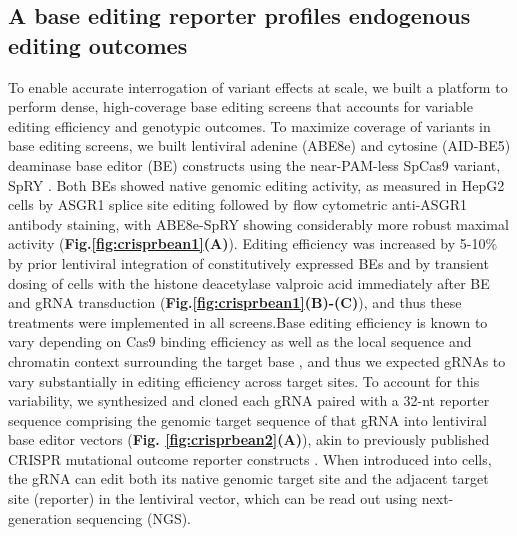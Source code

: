 \documentclass[a4paper, titlepage, openright]{book}
\begin{document}
\subsection{A base editing reporter profiles endogenous editing outcomes}
To enable accurate interrogation of variant effects at scale, we built a platform to perform dense, high-coverage base editing screens that accounts for variable editing efficiency and genotypic outcomes. To maximize coverage of variants in base editing screens, we built lentiviral adenine (ABE8e) \citep{gaudelli2017programmable, richter2020phage} and cytosine (AID-BE5) \citep{arbab2020determinants} deaminase base editor (BE) constructs using the near-PAM-less SpCas9 variant, SpRY \citep{walton2020unconstrained}. Both BEs showed native genomic editing activity, as measured in HepG2 cells by ASGR1 splice site editing followed by flow cytometric anti-ASGR1 antibody staining, with ABE8e-SpRY showing considerably more robust maximal activity (\textbf{Fig.\ref{fig:crisprbean1}(A)}). Editing efficiency was increased by 5-10\% by prior lentiviral integration of constitutively expressed BEs and by transient dosing of cells with the histone deacetylase valproic acid immediately after BE and gRNA transduction (\textbf{Fig.\ref{fig:crisprbean1}(B)-(C)}), and thus these treatments were implemented in all screens.Base editing efficiency is known to vary depending on Cas9 binding efficiency as well as the local sequence and chromatin context surrounding the target base \citep{arbab2020determinants, shin2021small, yang2023hmgn1}, and thus we expected gRNAs to vary substantially in editing efficiency across target sites. To account for this variability, we synthesized and cloned each gRNA paired with a 32-nt reporter sequence comprising the genomic target sequence of that gRNA into lentiviral base editor vectors (\textbf{Fig. \ref{fig:crisprbean2}(A)}), akin to previously published CRISPR mutational outcome reporter constructs \citep{sanchez2022base, kim2022high}. When introduced into cells, the gRNA can edit both its native genomic target site and the adjacent target site (reporter) in the lentiviral vector, which can be read out using next-generation sequencing (NGS). 
\end{document}
